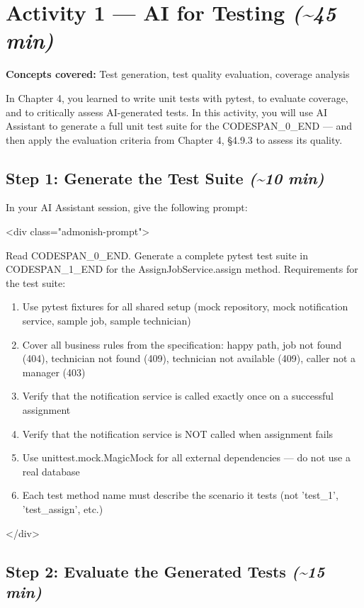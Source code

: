 \documentclass[11pt,a4paper]{book}
\begin{document}
\medskip

\section{Activity 1 --- AI for Testing \textit{(\textasciitilde{}45 min)}}

\textbf{Concepts covered:} Test generation, test quality evaluation, coverage analysis

In Chapter 4, you learned to write unit tests with pytest, to evaluate coverage, and to critically assess AI-generated tests. In this activity, you will use AI Assistant to generate a full unit test suite for the CODESPAN\_0\_END --- and then apply the evaluation criteria from Chapter 4, §4.9.3 to assess its quality.

\subsection{Step 1: Generate the Test Suite \textit{(\textasciitilde{}10 min)}}

In your AI Assistant session, give the following prompt:

<div class="admonish-prompt">

Read CODESPAN\_0\_END. Generate a complete pytest test suite in CODESPAN\_1\_END for the AssignJobService.assign method. Requirements for the test suite:

\begin{enumerate}
  \item Use pytest fixtures for all shared setup (mock repository, mock notification service, sample job, sample technician)
  \item Cover all business rules from the specification: happy path, job not found (404), technician not found (409), technician not available (409), caller not a manager (403)
  \item Verify that the notification service is called exactly once on a successful assignment
  \item Verify that the notification service is NOT called when assignment fails
  \item Use unittest.mock.MagicMock for all external dependencies --- do not use a real database
  \item Each test method name must describe the scenario it tests (not 'test\_1', 'test\_assign', etc.)
\end{enumerate}

</div>

\subsection{Step 2: Evaluate the Generated Tests \textit{(\textasciitilde{}15 min)}}
\end{document}
